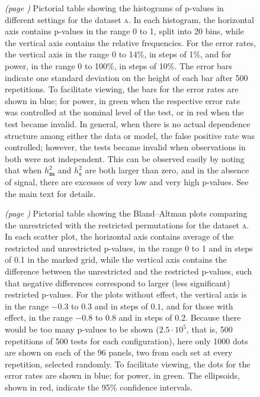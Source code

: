 \begin{figure}[!b]
\caption[Pictorial table showing histograms of p-values obtained in different settings.]{\emph{(page \pageref{fig:errorrates_noref})} Pictorial table showing the histograms of p-values in different settings for the dataset \textsc{a}. In each histogram, the horizontal axis contains p-values in the range 0 to 1, split into 20 bins, while the vertical axis contains the relative frequencies. For the error rates, the vertical axis in the range 0 to 14\%, in steps of 1\%, and for power, in the range 0 to 100\%, in steps of 10\%. The error bars indicate one standard deviation on the height of each bar after 500 repetitions. To facilitate viewing, the bars for the error rates are shown in blue; for power, in green when the respective error rate was controlled at the nominal level of the test, or in red when the test became invalid. In general, when there is no actual dependence structure among either the data or model, the false positive rate was controlled; however, the tests became invalid when observations in both were not independent. This can be observed easily by noting that when $h^2_{\mathbf{m}}$ and $h^2_{\boldsymbol{\epsilon}}$ are both larger than zero, and in the absence of signal, there are excesses of very low and very high p-values. See the main text for details.}
\label{fig:errorrates}
\end{figure}

\begin{figure}[!b]
\caption[Pictorial table showing the Bland--Altman plots comparing the permutation schemes.]{\emph{(page \pageref{fig:bland_altman_noref})} Pictorial table showing the Bland--Altman plots comparing the unrestricted with the restricted permutations for the dataset \textsc{a}. In each scatter plot, the horizontal axis contains average of the restricted and unrestricted p-values, in the range 0 to 1 and in steps of 0.1 in the marked grid, while the vertical axis contains the difference between the unrestricted and the restricted p-values, such that negative differences correspond to larger (less significant) restricted p-values. For the plots without effect, the vertical axis is in the range $-0.3$ to $0.3$ and in steps of $0.1$, and for those with effect, in the range $-0.8$ to $0.8$ and in steps of $0.2$. Because there would be too many p-values to be shown ($2.5\cdot 10^{5}$, that is, 500 repetitions of 500 tests for each configuration), here only 1000 dots are shown on each of the 96 panels, two from each set at every repetition, selected randomly. To facilitate viewing, the dots for the error rates are shown in blue; for power, in green. The ellipsoids, shown in red, indicate the 95\% confidence intervals.}
\label{fig:bland_altman}
\end{figure}

